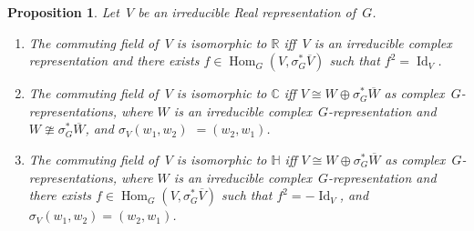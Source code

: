 \documentclass[11pt]{article}
\numberwithin{equation}{section}
\newtheorem{Proposition}[Theorem]{Proposition}
{\theoremstyle{definition}
\newtheorem{Definition}[Theorem]{Definition}
\newtheorem{Example}[Theorem]{Example}
\newtheorem{Remark}[Theorem]{Remark}
}
\DeclareMathOperator{\Hom}{Hom}
\DeclareMathOperator{\Id}{Id}
\begin{document}
\begin{Proposition}
\label{realrepclassification}
Let~$V$ be an irreducible Real representation of~$G$.
\begin{enumerate}\itemsep=0pt
\item[$1.$]
The commuting field of~$V$ is isomorphic to $\mathbb{R}$ iff~$V$ is an irreducible complex representation and there
exists $f\in\Hom_G(V,
\sigma_G^*\overline{V})$ such that $f^2=\Id_V$.
\item[$2.$]
The commuting field of~$V$ is isomorphic to $\mathbb{C}$ iff $V\cong W\oplus
\sigma_G^*\overline{W}$ as complex~$G$-representa\-tions,
where $W$ is an irreducible complex~$G$-representation and $W\ncong
\sigma_G^*\overline{W}$, and $\sigma_V(w_1, w_2)$ $=(w_2, w_1)$.
\item[$3.$]
The commuting field of~$V$ is isomorphic to $\mathbb{H}$ iff $V\cong W\oplus
\sigma_G^*\overline{W}$ as complex~$G$-repre\-sen\-ta\-tions,
where $W$ is an irreducible complex~$G$-representation and there exists
$f\in\Hom_G(V,\sigma_G^*\overline{V})$ such that $f^2=-\Id_V$, and $\sigma_V(w_1, w_2)=(w_2, w_1)$.
\end{enumerate}
\end{Proposition}
\end{document}
